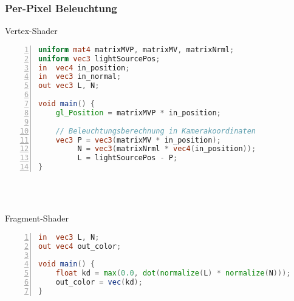 \subsubsection{Per-Pixel Beleuchtung}
\begin{minipage}{\textwidth}
Vertex-Shader
\begin{lstlisting}[frame=single,numbers=left,mathescape,language=GLSL]
uniform mat4 matrixMVP, matrixMV, matrixNrml;
uniform vec3 lightSourcePos;
in  vec4 in_position;
in  vec3 in_normal;
out vec3 L, N;

void main() {
	gl_Position = matrixMVP * in_position;

	// Beleuchtungsberechnung in Kamerakoordinaten
	vec3 P = vec3(matrixMV * in_position);
		 N = vec3(matrixNrml * vec4(in_position));
		 L = lightSourcePos - P;
}
\end{lstlisting}
\end{minipage}
\\\\
\begin{minipage}{\textwidth}
Fragment-Shader
\begin{lstlisting}[frame=single,numbers=left,mathescape,language=GLSL]
in  vec3 L, N;
out vec4 out_color;

void main() {
	float kd = max(0.0, dot(normalize(L) * normalize(N)));
	out_color = vec(kd);
}
\end{lstlisting}
\end{minipage}
